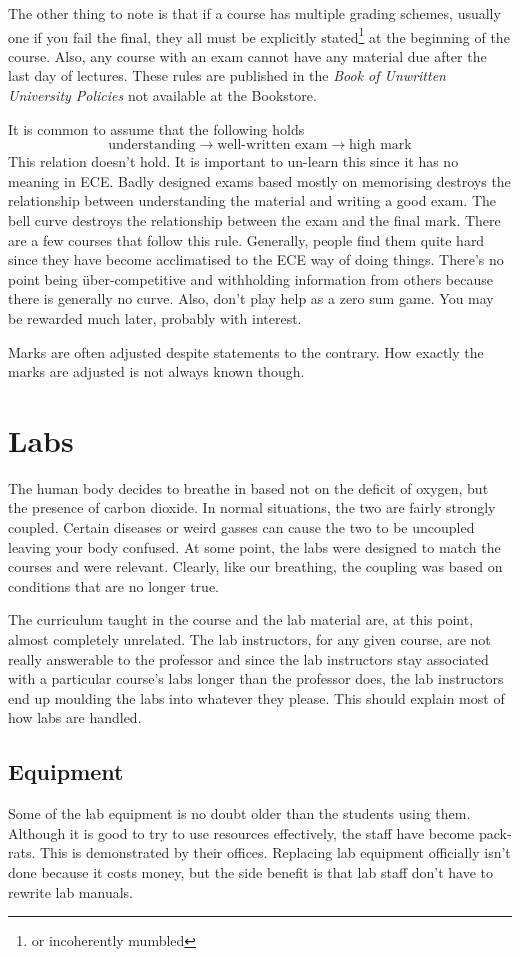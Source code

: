 \documentclass{book}
\begin{document}
The other thing to note is that if a course has multiple grading schemes, usually one if you fail the final, they all must be explicitly stated\footnote{or incoherently mumbled} at the beginning of the course. Also, any course with an exam cannot have any material due after the last day of lectures. These rules are published in the \textsl{Book of Unwritten University Policies} not available at the Bookstore.

It is common to assume that the following holds $$ \mbox{understanding} \to \mbox{well-written exam} \to \mbox{high mark} $$ This relation doesn't hold. It is important to un-learn this since it has no meaning in ECE. Badly designed exams based mostly on memorising destroys the relationship between understanding the material and writing a good exam. The bell curve destroys the relationship between the exam and the final mark. There are a few courses that follow this rule. Generally, people find them quite hard since they have become acclimatised to the ECE way of doing things. There's no point being \"uber-competitive and withholding information from others because there is generally no curve. Also, don't play help as a zero sum game. You may be rewarded much later, probably with interest.

Marks are often adjusted despite statements to the contrary. How exactly the marks are adjusted is not always known though.

\chapter{Labs}
The human body decides to breathe in based not on the deficit of oxygen, but the presence of carbon dioxide. In normal situations, the two are fairly strongly coupled. Certain diseases or weird gasses can cause the two to be uncoupled leaving your body confused. At some point, the labs were designed to match the courses and were relevant. Clearly, like our breathing, the coupling was based on conditions that are no longer true.

The curriculum taught in the course and the lab material are, at this point, almost completely unrelated. The lab instructors, for any given course, are not really answerable to the professor and since the lab instructors stay associated with a particular course's labs longer than the professor does, the lab instructors end up moulding the labs into whatever they please. This should explain most of how labs are handled.

\section{Equipment}
Some of the lab equipment is no doubt older than the students using them. Although it is good to try to use resources effectively, the staff have become pack-rats. This is demonstrated by their offices. Replacing lab equipment officially isn't done because it costs money, but the side benefit is that lab staff don't have to rewrite lab manuals.
\end{document}
